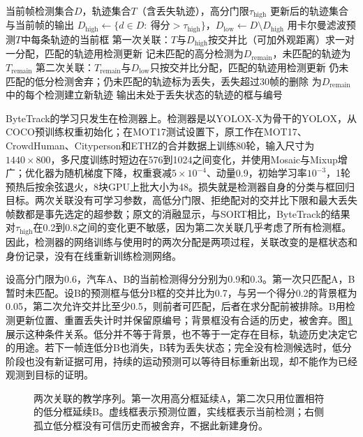 \begin{algorithm}[ByteTrack的逐帧关联]
  \label{alg:vision-video-byte}
  \begin{algorithmic}[1]
    \Require 当前帧检测集合$D$，轨迹集合$T$（含丢失轨迹），高分门限$\tau_{\mathrm{high}}$
    \Ensure 更新后的轨迹集合与当前帧的输出
    \State $D_{\mathrm{high}}\gets\{d\in D:\ \text{得分}>\tau_{\mathrm{high}}\}$，$D_{\mathrm{low}}\gets D\setminus D_{\mathrm{high}}$
    \State 用卡尔曼滤波预测$T$中每条轨迹的当前框
    \State 第一次关联：$T$与$D_{\mathrm{high}}$按交并比（可加外观距离）求一对一分配，匹配的轨迹用检测更新
    \State 记未匹配的高分检测为$D_{\mathrm{remain}}$，未匹配的轨迹为$T_{\mathrm{remain}}$
    \State 第二次关联：$T_{\mathrm{remain}}$与$D_{\mathrm{low}}$只按交并比分配，匹配的轨迹用检测更新
    \State 仍未匹配的低分检测舍弃；仍未匹配的轨迹标为丢失，丢失超过30帧的删除
    \State 为$D_{\mathrm{remain}}$中的每个检测建立新轨迹
    \State 输出未处于丢失状态的轨迹的框与编号
  \end{algorithmic}
\end{algorithm}

ByteTrack的学习只发生在检测器上。检测器是以YOLOX-X为骨干的YOLOX，从COCO预训练权重初始化；在MOT17测试设置下，原工作在MOT17、CrowdHuman、Cityperson和ETHZ的合并数据上训练80轮，输入尺寸为$1440\times800$，多尺度训练时短边在576到1024之间变化，并使用Mosaic与Mixup增广；优化器为随机梯度下降，权重衰减$5\times10^{-4}$、动量0.9，初始学习率$10^{-3}$，1轮预热后按余弦退火，8块GPU上批大小为48。损失就是检测器自身的分类与框回归目标。两次关联没有可学习参数，高低分门限、拒绝配对的交并比下限和最大丢失帧数都是事先选定的超参数；原文的消融显示，与SORT相比，ByteTrack的结果对$\tau_{\mathrm{high}}$在0.2到0.8之间的变化更不敏感，因为第二次关联几乎考虑了所有检测框。因此，检测器的网络训练与使用时的两次分配是两项过程，关联改变的是框状态和身份记录，没有在线重新训练检测网络。

设高分门限为0.6，汽车A、B的当前检测得分分别为0.9和0.3。第一次只匹配A，B暂时未匹配。设B的预测框与低分B框的交并比为0.7，与另一个得分0.2的背景框为0.05，第二次允许交并比至少0.5，则前者可匹配，后者在求分配前被排除。B用检测更新位置、重置丢失计时并保留原编号；背景框没有合适的历史，被舍弃。图\ref{fig:vision-bytetrack-association}展示这种条件关系。低分并不等于背景，也不等于一定存在目标，轨迹历史决定它的用途。若下一帧连低分B也消失，B转为丢失状态；完全没有检测候选时，低分阶段也没有新证据可用，持续的运动预测可以等待目标重新出现，却不能作为已经观测到目标的证明。

\begin{figure}[htbp]
  \centering
  
  \caption{两次关联的教学序列。第一次用高分框延续A，第二次只用位置相符的低分框延续B。虚线框表示预测位置，实线框表示当前检测；右侧孤立低分框没有可信历史而被舍弃，不据此新建身份。}
  \label{fig:vision-bytetrack-association}
\end{figure}


